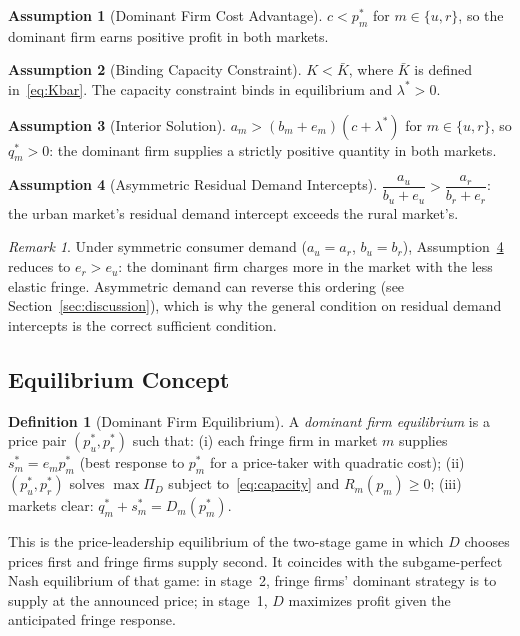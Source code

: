 \documentclass[12pt]{article}
\theoremstyle{plain}
\theoremstyle{definition}
\newtheorem{assumption}{Assumption}
\newtheorem{definition}{Definition}
\theoremstyle{remark}
\newtheorem{remark}{Remark}
\begin{document}
\begin{assumption}[Dominant Firm Cost Advantage]
\label{ass:A2}
$c < p_m^*$ for $m \in \{u, r\}$, so the dominant firm earns positive profit
in both markets.
\end{assumption}

\begin{assumption}[Binding Capacity Constraint]
\label{ass:A3}
$K < \bar{K}$, where $\bar{K}$ is defined in~\eqref{eq:Kbar}.  The capacity
constraint binds in equilibrium and $\lambda^* > 0$.
\end{assumption}

\begin{assumption}[Interior Solution]
\label{ass:H2}
$a_m > (b_m + e_m)(c + \lambda^*)$ for $m \in \{u, r\}$, so $q_m^* > 0$:
the dominant firm supplies a strictly positive quantity in both markets.
\end{assumption}

\begin{assumption}[Asymmetric Residual Demand Intercepts]
\label{ass:A4prime}
$\dfrac{a_u}{b_u + e_u} > \dfrac{a_r}{b_r + e_r}$: the urban market's residual
demand intercept exceeds the rural market's.
\end{assumption}

\begin{remark}
Under symmetric consumer demand ($a_u = a_r$, $b_u = b_r$), Assumption~\ref{ass:A4prime}
reduces to $e_r > e_u$: the dominant firm charges more in the market with
the less elastic fringe.  Asymmetric demand can reverse this ordering (see
Section~\ref{sec:discussion}), which is why the general condition on residual
demand intercepts is the correct sufficient condition.
\end{remark}

\subsection{Equilibrium Concept}

\begin{definition}[Dominant Firm Equilibrium]
A \emph{dominant firm equilibrium} is a price pair $(p_u^*, p_r^*)$ such that:
(i) each fringe firm in market $m$ supplies $s_m^* = e_m p_m^*$ (best response
to $p_m^*$ for a price-taker with quadratic cost); (ii) $(p_u^*, p_r^*)$ solves
$\max \Pi_D$ subject to~\eqref{eq:capacity} and $R_m(p_m) \geq 0$; (iii)
markets clear: $q_m^* + s_m^* = D_m(p_m^*)$.
\end{definition}

This is the price-leadership equilibrium of the two-stage game in which $D$
chooses prices first and fringe firms supply second.  It coincides with the
subgame-perfect Nash equilibrium of that game: in stage~2, fringe firms'
dominant strategy is to supply at the announced price; in stage~1, $D$
maximizes profit given the anticipated fringe response.
\end{document}
